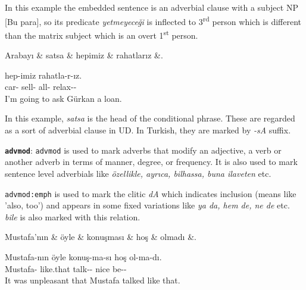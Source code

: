 \documentclass[11pt,a4paper]{article}
\begin{document}
In this example the embedded sentence is an adverbial clause with a subject NP [Bu para], so its predicate \textit{yetmeyeceği} is inflected to 3\textsuperscript{rd} person which is different than the matrix subject which is an overt 1\textsuperscript{st} person.

\begin{exe}
\ex \label{advcl}
\begin{dependency}
\begin{deptext}[column sep=0.32cm]
Arabayı \& satsa \& hepimiz \& rahatlarız \&. \\
\end{deptext}
\end{dependency}
 hep-imiz rahatla-r-ız.  \\
car-\Acc{} sell-\Cond{} all-\Fpl{} relax-\Prs{}-\Fpl{} \\
 I’m going to ask Gürkan a loan.
\end{exe}

In this example,  \textit{satsa} is the head of the conditional phrase. These are regarded as a sort of adverbial clause in UD. In Turkish, they are marked by \textit{-sA} suffix.

\textbf{\texttt{advmod}}:
\texttt{advmod} is used to mark adverbs that modify an adjective, a verb or another adverb in terms of manner, degree, or frequency. It is also used to mark sentence level adverbials like \textit{özellikle, ayrıca, bilhassa, buna ilaveten} etc.

\texttt{advmod:emph} is used to mark the clitic \textit{dA} which indicates inclusion (means like 'also, too') and appears in some fixed variations like \textit{ya da, hem de, ne de} etc. \textit{bile} is also marked with this relation.

\begin{exe}
\ex \label{advmod}
\begin{dependency}
\begin{deptext}[column sep=0.3cm]
Mustafa'nın \& öyle \& konuşması \& hoş \& olmadı \&. \\
\end{deptext}
\end{dependency}
\gll Mustafa-nın öyle konuş-ma-sı hoş ol-ma-dı.  \\
Mustafa-\Gen{} like.that talk-\Neg{}-\Tsg{} nice be-\Neg{}-\Pst{} \\
\glt It was unpleasant that Mustafa talked like that.
\end{exe}
\end{document}
